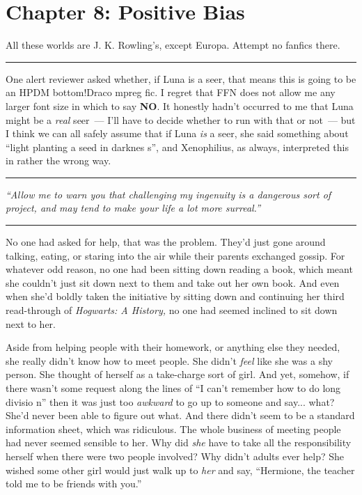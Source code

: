 \chapter{Chapter 8: Positive Bias}
All these worlds are J. K. Rowling's, except Europa. Attempt no fanfics there.

\begin{center}\rule{3in}{0.4pt}\end{center}

One alert reviewer asked whether, if Luna is a seer, that means this is going to be an HPDM bottom!Draco mpreg fic. I regret that FFN does not allow me any larger font size in which to say \textbf{NO}. It honestly hadn't occurred to me that Luna might be a \emph{real} seer~--- I'll have to decide whether to run with that or not~--- but I think we can all safely assume that if Luna \emph{is} a seer, she said something about ``light planting a seed in darknes s'', and Xenophilius, as always, interpreted this in rather the wrong way.

\begin{center}\rule{3in}{0.4pt}\end{center}

\emph{``Allow me to warn you that challenging my ingenuity is a dangerous sort of project, and may tend to make your life a lot more surreal.''}

\begin{center}\rule{3in}{0.4pt}\end{center}

No one had asked for help, that was the problem. They'd just gone around talking, eating, or staring into the air while their parents exchanged gossip. For whatever odd reason, no one had been sitting down reading a book, which meant she couldn't just sit down next to them and take out her own book. And even when she'd boldly taken the initiative by sitting down and continuing her third read-through of \emph{Hogwarts: A History,} no one had seemed inclined to sit down next to her.

Aside from helping people with their homework, or anything else they needed, she really didn't know how to meet people. She didn't \emph{feel} like she was a shy person. She thought of herself as a take-charge sort of girl. And yet, somehow, if there wasn't some request along the lines of ``I can't remember how to do long divisio n'' then it was just too \emph{awkward} to go up to someone and say... what? She'd never been able to figure out what. And there didn't seem to be a standard information sheet, which was ridiculous. The whole business of meeting people had never seemed sensible to her. Why did \emph{she} have to take all the responsibility herself when there were two people involved? Why didn't adults ever help? She wished some other girl would just walk up to \emph{her} and say, ``Hermione, the teacher told me to be friends with you.''

